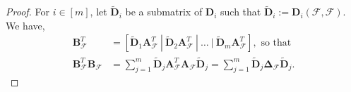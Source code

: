 \documentclass[journal,draftcls,onecolumn]{IEEEtran}
\theoremstyle{mystyle}
\newcommand{\bfD}{\mathbf{D}}
\newcommand{\bfA}{\mathbf{A}}
\newcommand{\bfB}{\mathbf{B}}
\newcommand{\cF}{\mathcal{F}}
\newcommand{\aditya}[1]{\marginpar{+}{\bf Aditya's remark}: {\em #1}}
\newcommand{\sifat}[1]{\marginpar{+}{\bf Sifat's remark}: {\em #1}}
\begin{document}
\begin{proof}%
For $i \in [m]$, let $\tilde{\mathbf{D}}_i$ be a submatrix of $\mathbf{D}_i$ such that $\tilde{\mathbf{D}}_i :=\mathbf{D}_i(\mathcal{F}, \mathcal{F})$. We have, %
\begin{align*}
\bfB_{\cF}^T &= [\tilde{\bfD}_1 \bfA_{\cF}^T ~|~ \tilde{\bfD}_2 \bfA_{\cF}^T ~|~ \dots ~|~\tilde{\bfD}_m\bfA_{\cF}^T], \text{~so that}\\
\bfB_{\cF}^T\bfB_{\cF} & =  \sum_{j = 1}^m \tilde{\bfD}_j\bfA_{\cF}^T\bfA_{\cF}\tilde{\bfD}_j = \sum_{j = 1}^m \tilde{\bfD}_j \mathbf{\Delta}_{\mathcal{F}} \tilde{\bfD}_j .
\end{align*}

\end{proof}
\end{document}
